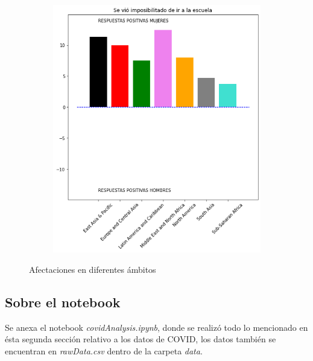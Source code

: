 \documentclass[12pt]{article}
\begin{document}
\begin{figure}
\begin{subfigure}[b]{0.45\textwidth}
         \caption{}
         \label{fig:227}
     \end{subfigure}
     \hfill
     \begin{subfigure}[b]{0.45\textwidth}
         \centering
         \includegraphics[width=\textwidth]{images/228.png}
         \caption{}
         \label{fig:228}
     \end{subfigure}
        \caption{Afectaciones en diferentes ámbitos}
        \label{fig:22_2}
\end{figure}
\subsection{Sobre el notebook}
Se anexa el notebook \textit{covidAnalysis.ipynb}, donde se realizó todo lo mencionado en ésta segunda sección relativo a los datos de COVID, los datos también se encuentran en \textit{rawData.csv} dentro de la carpeta \textit{data}.

\printbibliography[heading=bibintoc]
\end{document}
